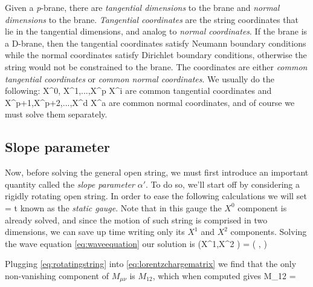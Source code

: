 \documentclass[oneside, 12pt]{book}
\begin{document}
Given a \textit{p}-brane, there are \textit{tangential dimensions} to the brane and \textit{normal dimensions} to the brane. \textit{Tangential coordinates} are the string coordinates that lie in the tangential dimensions, and analog to \textit{normal coordinates}. If the brane is a D-brane, then the tangential coordinates satisfy Neumann boundary conditions while the normal coordinates satisfy Dirichlet boundary conditions, otherwise the string would not be constrained to the brane. The coordinates are either \textit{common tangential coordinates} or \textit{common normal coordinates}. We usually do the following:
\beq[] X^0, X^1,...,X^p  X^i\eeq
are common tangential coordinates and
\beq[] X^{p+1},X^{p+2},...,X^d  X^a\eeq
are common normal coordinates, and of course we must solve them separately.\par

\subsection{Slope parameter}

Now, before solving the general open string, we must first introduce an important quantity called the \textit{slope parameter} \(\alpha'\). To do so, we'll start off by considering a rigidly rotating open string. In order to ease the following calculations we will set
\beq[] \tau = t \eeq
known as the \textit{static gauge}. Note that in this gauge the \(X^0\) component is already solved, and since the motion of such string is comprised in two dimensions, we can save up time writing only its \(X^1\) and \(X^2\) components. Solving the wave equation \eqref{eq:waveequation} our solution is
\beq[eq:rotatingstring] \left(X^1,X^2 \right) = \left( , \right) \eeq\par

Plugging \eqref{eq:rotatingstring} into \eqref{eq:lorentzchargematrix} we find that the only non-vanishing component of \(M_{\mu\nu}\) is \(M_{12}\), which when computed gives
\beq[eq:rotatingangularmomentum] M_{12} =  \eeq\par
\end{document}
